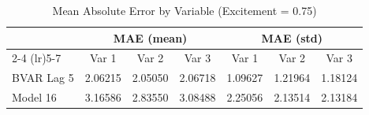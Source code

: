 \begin{table}[htbp]
\centering
\caption{Mean Absolute Error by Variable (Excitement = 0.75)}
\label{tab:mae_0p75}
\begin{tabular}{lcccccc}
\toprule
 & \multicolumn{3}{c}{MAE (mean)} & \multicolumn{3}{c}{MAE (std)} \\
\cmidrule(lr){2-4} \cmidrule(lr){5-7}
 & Var 1 & Var 2 & Var 3 & Var 1 & Var 2 & Var 3 \\
\midrule
BVAR Lag 5 & 2.06215 & 2.05050 & 2.06718 & 1.09627 & 1.21964 & 1.18124 \\
Model 16 & 3.16586 & 2.83550 & 3.08488 & 2.25056 & 2.13514 & 2.13184 \\
\bottomrule
\end{tabular}
\end{table}
